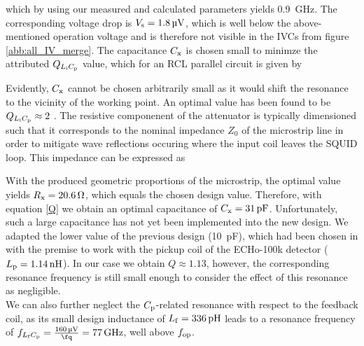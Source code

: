 
which by using our measured and calculated parameters yields \qty{0.9}{\GHz}. The corresponding voltage drop is $V_{\rm s}=\qty{1.8}{\uV}$, which is well below the above-mentioned operation voltage and is therefore not visible in the IVCs from figure \ref{abb:all_IV_merge}. The capacitance $C_{\rm x}$ is chosen small to minimze the attributed $Q_{L_{\rm i}C_{\rm p}}$ value, which for an RCL parallel circuit is given by 



Evidently, $C_{\rm x}$ cannot be chosen arbitrarily small as it would shift the resonance to the vicinity of the working point. An optimal value has been found to be $Q_{L_{\rm i}C_{\rm p}}\approx 2$ \cite{Cantor1996}. The resistive componenent of the attenuator is typically dimensioned such that it corresponds to the nominal impedance $Z_0$ of the microstrip line in order to mitigate wave reflections occuring where the input coil leaves the SQUID loop. This impedance can be expressed as \cite{EnpukuI1991} 


With the produced geometric proportions of the microstrip, the optimal value yields $R_{\rm x}=\qty{20.6}{\ohm}$, which equals the chosen design value. Therefore, with equation \ref{Q} we obtain an optimal capacitance of $C_{\rm x}=\qty{31}{\pF}$. Unfortunately, such a large capacitance has not yet been implemented into the new design. We adapted the lower value of the previous design (\qty{10}{\pF}), which had been chosen in \cite{Bauer2022} with the premise to work with the pickup coil of the ECHo-100k detector ($L_{\rm p}=\qty{1.14}{\nH}$). In our case we obtain $Q\approx 1.13$, however, the corresponding resonance frequency is still small enough to consider the effect of this resonance as negligible. \\
We can also further neglect the $C_{\rm p}$-related resonance with respect to the feedback coil, as its small design inductance of $L_{\rm f}=\qty{336}{\pH}$ leads to a resonance frequency of $f_{L_{\rm f}C_{\rm p}}=\frac{\qty{160}{\uV}}{\unit{\fq}}=\qty{77}{\GHz}$, well above $f_{\rm op}$. 
\\


